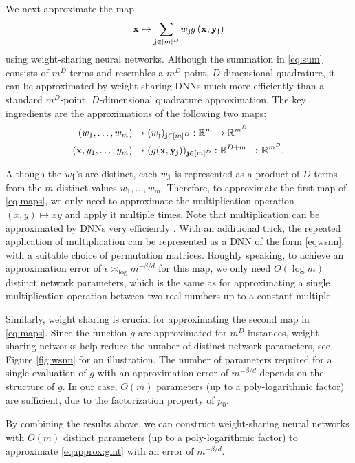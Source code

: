 \documentclass[twoside,11pt]{article}
\newcommand{\bj}{{\bf j}}
\newcommand{\bx}{{\bf x}}
\newcommand{\by}{{\bf y}}
\newcommand{\bbR}{{\mathbb R}}
\newcommand{\be}{\begin{equation}}
\newcommand{\ee}{\end{equation}}
\begin{document}
We next approximate the map
\be \label{eq:sum}
 \bx \mapsto \sum_{\bj \in [m]^D} w_\bj g \left( \bx, \by_\bj \right)
\ee
using weight-sharing neural networks. Although the summation in \eqref{eq:sum} consists of $m^D$ terms and resembles a $m^D$-point, $D$-dimensional quadrature, it can be approximated by weight-sharing DNNs much more efficiently than a standard $m^D$-point, $D$-dimensional quadrature approximation. The key ingredients are the approximations of the following two maps:
\be\begin{split} \label{eq:maps}
 (w_1, \ldots, w_{m}) &\mapsto (w_\bj)_{\bj \in [m]^D}: \bbR^{m} \to \bbR^{m^D}
 \\
 (\bx, y_1, \ldots, y_{m}) &\mapsto (g(\bx, \by_\bj))_{\bj \in [m]^D}: \bbR^{D + m} \to \bbR^{m^D}.
\end{split}\ee

Although the $w_\bj$'s are distinct, each $w_{\bj}$ is represented as a product of $D$ terms from the $m$ distinct values $w_1, \ldots, w_{m}$. Therefore, to approximate the first map of \eqref{eq:maps}, we only need to approximate the multiplication operation $(x, y) \mapsto xy$ and apply it multiple times. Note that multiplication can be approximated by DNNs very efficiently \citep{schmidt2020nonparametric}. With an additional trick, the repeated application of multiplication can be represented as a DNN of the form \eqref{eqwsnn}, with a suitable choice of permutation matrices. Roughly speaking, to achieve an approximation error of $\epsilon \asymp_{\log} m^{-\beta/d}$ for this map, we only need $O(\log m)$ distinct network parameters, which is the same as for approximating a single multiplication operation between two real numbers up to a constant multiple.

Similarly, weight sharing is crucial for approximating the second map in \eqref{eq:maps}. Since the function $g$ are approximated for $m^D$ instances, weight-sharing networks help reduce the number of distinct network parameters, see Figure \ref{fig:wsnn} for an illustration. The number of parameters required for a single evaluation of $g$ with an approximation error of $m^{-\beta/d}$ depends on the structure of $g$. In our case, $O(m)$ parameters (up to a poly-logarithmic factor) are sufficient, due to the factorization property of $p_0$.

By combining the results above, we can construct weight-sharing neural networks with $O(m)$ distinct parameters (up to a poly-logarithmic factor) to approximate \eqref{eqapprox:gint} with an error of $m^{-\beta/d}$.
\end{document}
